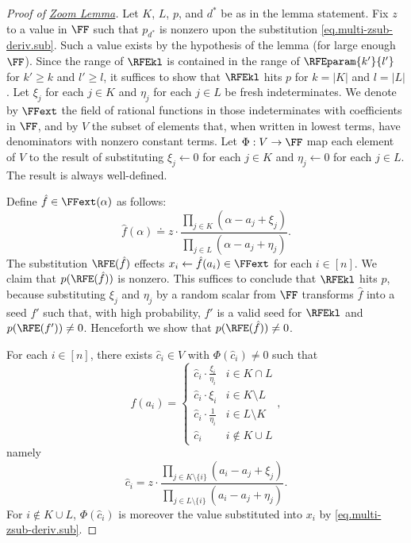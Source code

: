 \begin{proof}[Proof of \texorpdfstring{\hyperref[lem.multi-zsub-deriv]{Zoom Lemma}}{Zoom Lemma}]
  Let \(K\), \(L\), \(p\), and \(d^*\) be as in the lemma statement. Fix $z$ to a value in $\FF$ such that $p_{d^*}$ is nonzero upon the substitution \eqref{eq.multi-zsub-deriv.sub}. Such a value exists by the hypothesis of the lemma (for large enough $\FF$). Since the range of $\RFEkl$ is contained in the range of $\RFEparam{k'}{l'}$ for $k'\ge k$ and $l'\ge l$, 
  it suffices to show that $\RFEkl$ hits $p$ for \(k = |K|\) and \(l = |L|\).
  Let \(\xi_j\) for each \(j \in K\)
  and \(\eta_j\) for each \(j \in L\)
  be fresh indeterminates.
  We denote by \(\FFext\) the field of rational functions in those
  indeterminates with coefficients in $\FF$, and by
  $V$ the subset of elements that, when written in lowest terms,
  have denominators with nonzero constant terms.
  Let \(\Phi : V \to \FF\) map each element of \(V\) to the result of
  substituting \(\xi_j \gets 0\) for each \(j \in K\) and \(\eta_j \gets 0\)
  for each \(j \in L\).
  The result is always well-defined.

  Define \(\hat{f} \in \FFext(\alpha)\) as follows:
  \begin{equation*}
    \hat{f}(\alpha)
    \doteq
    z\cdot \frac{\prod_{j \in K}(\alpha - a_j + \xi_j)}%
                {\prod_{j \in L}(\alpha - a_j + \eta_j)}.
  \end{equation*}
  The substitution \(\RFE(\hat{f})\) effects
  \(x_i \gets \hat{f}(a_i) \in \FFext\) for each $i \in [n]$.
  We claim that \(p(\RFE(\hat{f}))\) is nonzero.
  This suffices to conclude that \(\RFEkl\) hits \(p\),
  because substituting \(\xi_j\) and \(\eta_j\) by a random scalar from
  \(\FF\) transforms \(\hat{f}\) into a seed $f'$
  such that,
  with high probability,
  $f'$ is a valid seed for \(\RFEkl\)
  and \(p(\RFE(f')) \ne 0\).
  Henceforth we show that \(p(\RFE(\hat{f})) \ne 0\).

  For each \(i \in [n]\),
  there exists \(\hat{c}_i \in V\)
  with \(\Phi(\hat{c}_i) \ne 0\)
  such that
  \begin{equation} \label{eq.multi-zsub-deriv.pf.seed}
    \hat{f}(a_i) = \begin{cases}
      \hat{c}_i\cdot \frac{\xi_i}{\eta_i} & i \in K\cap L \\
      \hat{c}_i\cdot \xi_i & i \in K\setminus L \\
      \hat{c}_i\cdot \frac{1}{\eta_i} & i \in L \setminus K \\
      \hat{c}_i & i \not\in K \cup L
    \end{cases},
  \end{equation}
  namely
  \[
    \hat{c}_i =  z\cdot
      \frac{\prod_{j \in K\setminus\{i\}}(a_i - a_j + \xi_j)}%
           {\prod_{j \in L\setminus\{i\}}(a_i - a_j + \eta_j)}.
  \]
  For \(i \not\in K \cup L\),
  \(\Phi(\hat{c}_i)\) is moreover the value substituted into \(x_i\) by
  \eqref{eq.multi-zsub-deriv.sub}.


\end{proof}
